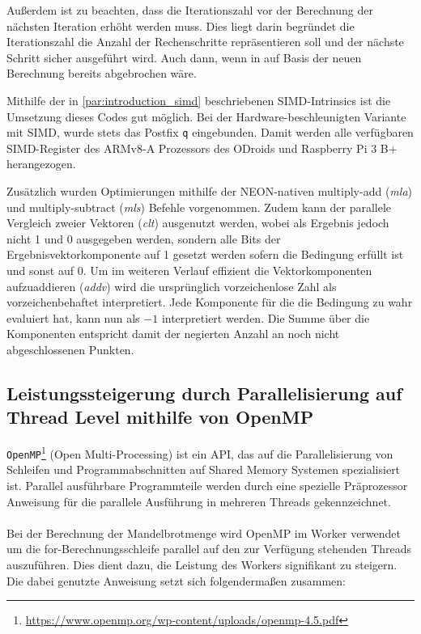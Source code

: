 Außerdem ist zu beachten, dass die Iterationszahl vor der Berechnung der nächsten Iteration erhöht werden muss.
Dies liegt darin begründet die Iterationszahl die Anzahl der Rechenschritte repräsentieren soll und
der nächste Schritt sicher ausgeführt wird. Auch dann, wenn in auf Basis der neuen Berechnung bereits abgebrochen wäre.

\begin{figure}[h!]
	
\end{figure}

Mithilfe der in \autoref{par:introduction_simd} beschriebenen SIMD-Intrinsics ist die Umsetzung dieses Codes gut möglich.
Bei der Hardware-beschleunigten Variante mit SIMD, wurde stets das Postfix \verb|q| eingebunden.
Damit werden alle verfügbaren SIMD-Register des ARMv8-A Prozessors des ODroids und Raspberry Pi 3 B+ herangezogen.

Zusätzlich wurden Optimierungen mithilfe der NEON-nativen multiply-add (\textit{mla}) und multiply-subtract (\textit{mls}) Befehle vorgenommen.
Zudem kann der parallele Vergleich zweier Vektoren (\textit{clt}) ausgenutzt werden, wobei als Ergebnis jedoch nicht 1 und 0 ausgegeben werden,
sondern alle Bits der Ergebnisvektorkomponente auf 1 gesetzt werden sofern die Bedingung erfüllt ist und sonst auf 0.
Um im weiteren Verlauf effizient die Vektorkomponenten aufzuaddieren (\textit{addv}) wird die ursprünglich vorzeichenlose Zahl als vorzeichenbehaftet interpretiert.
Jede Komponente für die die Bedingung zu wahr evaluiert hat, kann nun als $-1$ interpretiert werden.
Die Summe über die Komponenten entspricht damit der negierten Anzahl an noch nicht abgeschlossenen Punkten.

\subsection{Leistungssteigerung durch Parallelisierung auf Thread Level mithilfe von OpenMP}

\verb|OpenMP|\footnote{\url{https://www.openmp.org/wp-content/uploads/openmp-4.5.pdf}} (Open Multi-Processing) ist ein API, das auf die Parallelisierung von Schleifen und Programmabschnitten auf Shared Memory Systemen spezialisiert ist. Parallel ausführbare Programmteile werden durch eine spezielle Präprozessor Anweisung für die parallele Ausführung in mehreren Threads gekennzeichnet.
\\ \\
Bei der Berechnung der Mandelbrotmenge wird OpenMP im Worker verwendet um die for-Berechnungsschleife parallel auf den zur Verfügung stehenden Threads auszuführen. Dies dient dazu, die Leistung des Workers signifikant zu steigern. Die dabei genutzte Anweisung setzt sich folgendermaßen zusammen:

